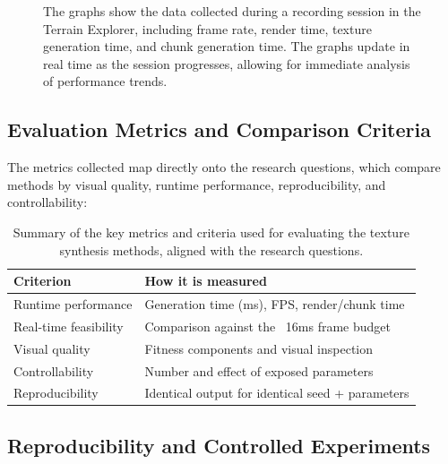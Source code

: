 \begin{figure}[H]
    \centering
    {The graphs show the data collected during a recording session in the Terrain Explorer, including frame rate, render time, texture generation time, and chunk generation time. The graphs update in real time as the session progresses, allowing for immediate analysis of performance trends.}
    \label{fig:live-graphs}
\end{figure}

\subsection{Evaluation Metrics and Comparison Criteria}

The metrics collected map directly onto the research questions, which compare methods by visual quality, runtime performance, reproducibility, and controllability:

\begin{table}[H]
    \centering
    \caption{Summary of the key metrics and criteria used for evaluating the texture synthesis methods, aligned with the research questions.}
    \label{tab:metrics-and-criteria}
    \begin{tabularx}{\textwidth}{|l|X|}
    \hline
    \textbf{Criterion} & \textbf{How it is measured} \\
    \hline
    \hline
    
    Runtime performance & Generation time (ms), FPS, render/chunk time \\
    \hline

    Real-time feasibility & Comparison against the ~16ms frame budget \\
    \hline

    Visual quality & Fitness components and visual inspection \\
    \hline

    Controllability & Number and effect of exposed parameters \\
    \hline

    Reproducibility & Identical output for identical seed + parameters \\
    \hline
    
    \end{tabularx}
\end{table}

\subsection{Reproducibility and Controlled Experiments}

